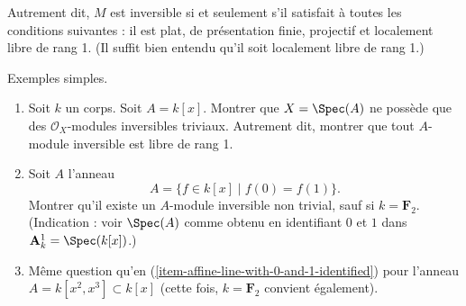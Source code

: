 \noindent
Autrement dit, $M$ est inversible si et seulement s'il
satisfait à toutes les conditions suivantes :
il est plat, de présentation finie, projectif et
localement libre de rang 1. (Il suffit bien entendu qu'il
soit localement libre de rang 1.)

\begin{exercise}
\label{exercise-simple-examples-invertible}
Exemples simples.
\begin{enumerate}
\item
\label{item-affine-line}
Soit $k$ un corps. Soit $A = k[x]$.
Montrer que $X = \Spec(A)$ ne possède que des
${\mathcal O}_X$-modules inversibles triviaux. Autrement dit, montrer que tout
$A$-module inversible est libre de rang 1.
\item
\label{item-affine-line-with-0-and-1-identified}
Soit $A$ l'anneau
$$
A = \{ f\in k[x] \mid f(0) = f(1) \}.
$$
Montrer qu'il existe un $A$-module inversible non trivial, sauf si
$k = {\mathbf F}_2$. (Indication : voir $\Spec(A)$ comme obtenu en identifiant
$0$ et $1$ dans ${\mathbf A}^1_k = \Spec(k[x])$.)
\item
\label{item-affine-line-with-cusp}
Même question qu'en (\ref{item-affine-line-with-0-and-1-identified})
pour l'anneau $A = k[x^2, x^3] \subset k[x]$
(cette fois, $k = {\mathbf F}_2$ convient également).
\end{enumerate}
\end{exercise}

